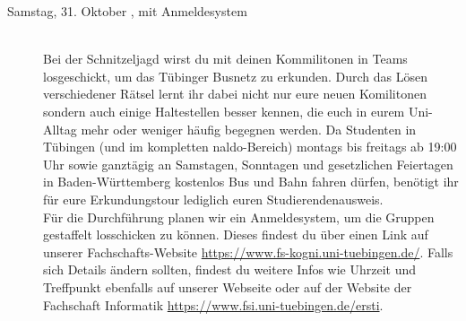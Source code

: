 \begin{description}


\ifkogwiss
\item[Samstag, 31. Oktober \YEAR, mit Anmeldesystem]\ \\
    Bei der Schnitzeljagd wirst du mit deinen Kommilitonen in Teams losgeschickt, um das Tübinger Busnetz zu erkunden. Durch das Lösen verschiedener Rätsel lernt ihr dabei nicht nur eure neuen Komilitonen sondern auch einige Haltestellen besser kennen, die euch in eurem Uni-Alltag mehr oder weniger häufig begegnen werden. Da Studenten in Tübingen (und im kompletten naldo-Bereich) montags bis freitags ab 19:00 Uhr sowie ganztägig an Samstagen, Sonntagen und gesetzlichen Feiertagen in Baden-Württemberg kostenlos Bus und Bahn fahren dürfen, benötigt ihr für eure Erkundungstour lediglich euren Studierendenausweis.\\
    Für die Durchführung planen wir ein Anmeldesystem, um die Gruppen gestaffelt losschicken zu können. Dieses findest du über einen Link auf unserer Fachschafts-Website \url{https://www.fs-kogni.uni-tuebingen.de/}.
    Falls sich Details ändern sollten, findest du weitere Infos wie Uhrzeit und Treffpunkt ebenfalls auf unserer Webseite oder auf der Website der Fachschaft Informatik \url{https://www.fsi.uni-tuebingen.de/ersti}.\\
\fi


\end{description}
